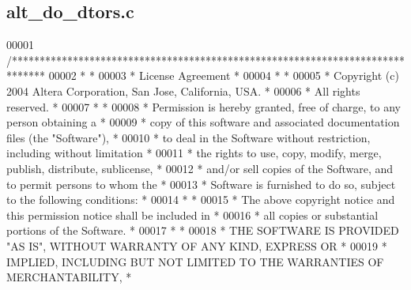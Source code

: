 \subsection{alt\+\_\+do\+\_\+dtors.\+c}
\label{alt__do__dtors_8c_source}

\begin{DoxyCode}
00001 \textcolor{comment}{/******************************************************************************}
00002 \textcolor{comment}{*                                                                             *}
00003 \textcolor{comment}{* License Agreement                                                           *}
00004 \textcolor{comment}{*                                                                             *}
00005 \textcolor{comment}{* Copyright (c) 2004 Altera Corporation, San Jose, California, USA.           *}
00006 \textcolor{comment}{* All rights reserved.                                                        *}
00007 \textcolor{comment}{*                                                                             *}
00008 \textcolor{comment}{* Permission is hereby granted, free of charge, to any person obtaining a     *}
00009 \textcolor{comment}{* copy of this software and associated documentation files (the "Software"),  *}
00010 \textcolor{comment}{* to deal in the Software without restriction, including without limitation   *}
00011 \textcolor{comment}{* the rights to use, copy, modify, merge, publish, distribute, sublicense,    *}
00012 \textcolor{comment}{* and/or sell copies of the Software, and to permit persons to whom the       *}
00013 \textcolor{comment}{* Software is furnished to do so, subject to the following conditions:        *}
00014 \textcolor{comment}{*                                                                             *}
00015 \textcolor{comment}{* The above copyright notice and this permission notice shall be included in  *}
00016 \textcolor{comment}{* all copies or substantial portions of the Software.                         *}
00017 \textcolor{comment}{*                                                                             *}
00018 \textcolor{comment}{* THE SOFTWARE IS PROVIDED "AS IS", WITHOUT WARRANTY OF ANY KIND, EXPRESS OR  *}
00019 \textcolor{comment}{* IMPLIED, INCLUDING BUT NOT LIMITED TO THE WARRANTIES OF MERCHANTABILITY,    *}

\end{DoxyCode}
